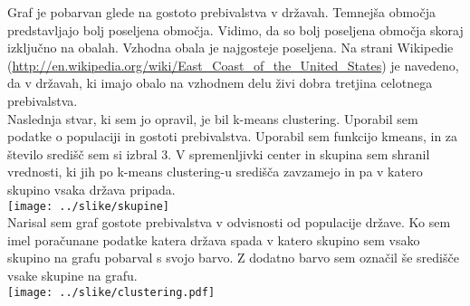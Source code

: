 \documentclass[11pt,a4paper]{article}
\begin{document}
Graf je pobarvan glede na gostoto prebivalstva v državah. Temnejša območja predstavljajo bolj poseljena območja. Vidimo, da so bolj poseljena območja skoraj izključno na obalah. Vzhodna obala je najgosteje poseljena. Na strani Wikipedie (\url{http://en.wikipedia.org/wiki/East_Coast_of_the_United_States}) je navedeno, da v državah, ki imajo obalo na vzhodnem delu živi dobra tretjina celotnega prebivalstva.\\

Naslednja stvar, ki sem jo opravil, je bil k-means clustering. Uporabil sem podatke o populaciji in gostoti prebivalstva. Uporabil sem funkcijo kmeans, in za število središč sem si izbral 3.
V spremenljivki center in skupina sem shranil vrednosti, ki jih po k-means clustering-u središča zavzamejo in pa v katero skupino vsaka država pripada.\\

\texttt{[image: ../slike/skupine]} \\

Narisal sem graf gostote prebivalstva v odvisnosti od populacije države. Ko sem imel poračunane podatke katera država spada v katero skupino sem vsako skupino na grafu pobarval s svojo barvo. Z dodatno barvo sem označil še središče vsake skupine na grafu.\\

\texttt{[image: ../slike/clustering.pdf]}
\end{document}
